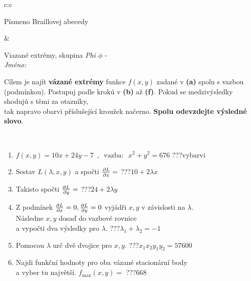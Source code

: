 \documentclass[10pt]{report}
\begin{document}
\begin{tabular}{c:c}
\begin{minipage}[c][104.5mm][t]{0.5\linewidth}
\begin{center}
\begin{minipage}{0.20\linewidth}
\begin{center}
{\small Písmeno Braillovej abecedy}
\end{center}
\end{minipage}
\end{center}
\end{minipage}
&
\begin{minipage}[c][104.5mm][t]{0.5\linewidth}
\begin{center}
\vspace{7mm}
{\huge Viazané extrémy, skupina \textit{Phi $\phi$} -}\\[5mm]
\textit{Jméno:}\phantom{xxxxxxxxxxxxxxxxxxxxxxxxxxxxxxxxxxxxxxxxxxxxxxxxxxxxxxxxxxxxxxxxx}\\[5mm]
\begin{minipage}{0.95\linewidth}
\begin{center}
Cílem je najít \textbf{vázané extrémy} funkce $f(x,y)$ zadané v \textbf{(a)} spolu s vazbou (podmínkou). Postupuj podle krokú v \textbf{(b)} až \textbf{(f)}. Pokud se medzivýsledky shodujú s těmi za otazníky,\\tak napravo obarvi příslušející kroužek načerno. \textbf{Spolu odevzdejte výsledné slovo}.
\end{center}
\end{minipage}
\\[1mm]
\begin{minipage}{0.79\linewidth}
\begin{center}
\begin{varwidth}{\linewidth}
\begin{enumerate}
\normalsize
\item $f(x,y)=10x+24y-7 \enspace , \enspace \mathrm{vazba:} \enspace x^2+y^2=676$\quad \dotfill\; ???\;\dotfill \quad vybarvi
\item Sestav $L(\lambda,x,y)$ a spočti $\pdv{L}{x}=$\quad \dotfill\; ???\;\dotfill \quad $10+2\lambda x$
\item Takisto spočti $\pdv{L}{y}=$\quad \dotfill\; ???\;\dotfill \quad $24+2\lambda y$
\item Z podmínek $\pdv{L}{x}=0 , \pdv{L}{y}=0$ vyjádři $x,y$ v závislosti na $\lambda$.\\ \phantom{xxxxxx}Následne $x,y$ dosaď do vazbové rovnice\\ \phantom{xxxxxx}a vypočti dva výsledky pro $\lambda$.\quad \dotfill\; ???\;\dotfill \quad $\lambda_1+\lambda_2=-1$
\item Pomocou $\lambda$ urč dvě dvojice pro $x,y$.\quad \dotfill\; ???\;\dotfill \quad $x_1 x_2 y_1 y_2=57600$
\item Najdi funkční hodnoty pro oba vázané stacionární body\\ \phantom{xxxxxx}a vyber tu najvětší. $f_{\text{max}}(x,y)=$\quad \dotfill\; ???\;\dotfill \quad $668$

\end{enumerate}
\end{varwidth}
\end{center}
\end{minipage}
\end{center}
\end{minipage}
\end{tabular}
\end{document}
